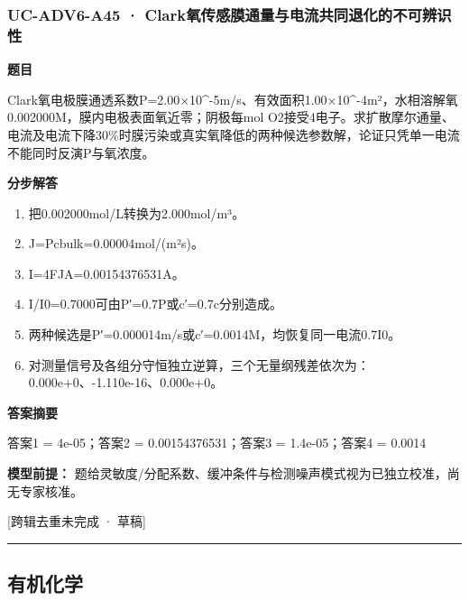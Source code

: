 \documentclass[UTF8,11pt,a4paper]{ctexart}
\begin{document}
\subsubsection*{UC-ADV6-A45 · Clark氧传感膜通量与电流共同退化的不可辨识性}
\noindent\textbf{题目}\par
Clark氧电极膜通透系数P=2.00×10\textasciicircum{}-5m/s、有效面积1.00×10\textasciicircum{}-4m²，水相溶解氧0.002000M，膜内电极表面氧近零；阴极每mol O2接受4电子。求扩散摩尔通量、电流及电流下降30\%时膜污染或真实氧降低的两种候选参数解，论证只凭单一电流不能同时反演P与氧浓度。\par
\medskip\noindent\textbf{分步解答}
\begin{enumerate}
\item 把0.002000mol/L转换为2.000mol/m³。
\item J=Pcbulk=0.00004mol/(m²s)。
\item I=4FJA=0.00154376531A。
\item I/I0=0.7000可由P′=0.7P或c′=0.7c分别造成。
\item 两种候选是P′=0.000014m/s或c′=0.0014M，均恢复同一电流0.7I0。
\item 对测量信号及各组分守恒独立逆算，三个无量纲残差依次为：0.000e+0、-1.110e-16、0.000e+0。
\end{enumerate}
\noindent\textbf{答案摘要}\par
答案1 = 4e-05；答案2 = 0.00154376531；答案3 = 1.4e-05；答案4 = 0.0014\par
\noindent\textbf{模型前提：}
题给灵敏度/分配系数、缓冲条件与检测噪声模式视为已独立校准，尚无专家核准。\par
\noindent\textcolor{red!65!black}{[跨辑去重未完成 · 草稿]} \par
\medskip\hrule\medskip
\subsection*{有机化学}
\end{document}
